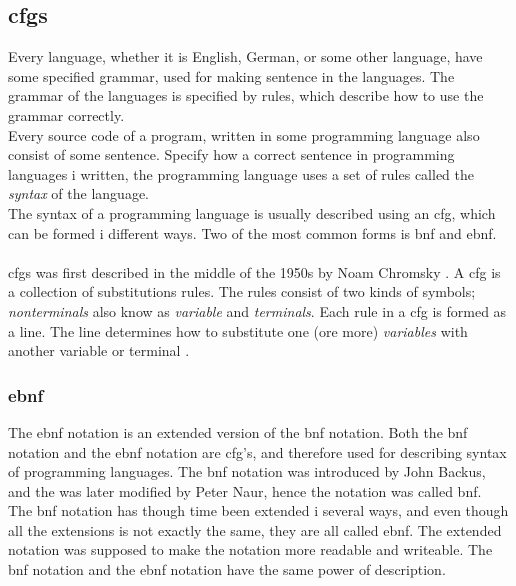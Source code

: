 \subsection{\ac{cfgs}}
Every language, whether it is English, German, or some other language, have some specified grammar, used for making sentence in the languages. The grammar of the languages is specified by rules, which describe how to use the grammar correctly. \\
Every source code of a program, written in some programming language also consist of some sentence. Specify how a correct sentence in programming languages i written, the programming language uses a set of rules called the \textit{syntax} of the language. \\
The syntax of a programming language is usually described using an \ac{cfg}, which can be formed i different ways. Two of the most common forms is \ac{bnf} and \ac{ebnf}. \\
\\
\ac{cfgs} was first described in the middle of the 1950s by Noam Chromsky \cite{concepts_prog_lang}. A \ac{cfg} is a collection of substitutions rules. The rules consist of two kinds of symbols; \textit{nonterminals} also know as \textit{variable} and \textit{terminals}. Each rule in a \ac{cfg} is formed as a line. The line determines how to substitute one (ore more) \textit{variables} with another variable or terminal \cite{syntax_book}.

\subsubsection*{\ac{ebnf}}
The \ac{ebnf} notation is an extended version of the \ac{bnf} notation. Both the \ac{bnf} notation and the \ac{ebnf} notation are \ac{cfg}'s, and therefore used for describing syntax of programming languages. The \ac{bnf} notation was introduced by John Backus, and the was later modified by Peter Naur, hence the notation was called \ac{bnf}. \\
The \ac{bnf} notation has though time been extended i several ways, and even though all the extensions is not exactly the same, they are all called \ac{ebnf}. The extended notation was supposed to make the notation more readable and writeable. The \ac{bnf} notation and the \ac{ebnf} notation have the same power of description. \cite{concepts_prog_lang}


